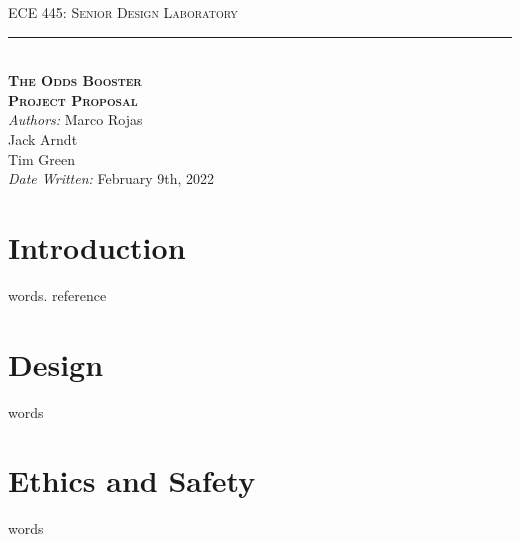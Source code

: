 \documentclass[12pt]{article}
\begin{document}
\begin{titlepage}
\begin{center}
{\LARGE \textsc{ECE 445: Senior Design Laboratory} \\ \vspace{8pt}}
\rule[13pt]{\textwidth}{1pt} \\ \vspace{120pt}
{\huge \textbf{\textsc{The Odds Booster}} \\ \vspace{8pt}}
{\LARGE \textbf{\textsc{Project Proposal}} \\ \vspace{30pt}} 
{\large \textit{Authors:} Marco Rojas \\ \vspace{4pt}
\hspace{48pt} Jack Arndt \\ \vspace{4pt}
\hspace{48pt} Tim Green \\ \vspace{4pt}
\hspace{8pt} \textit{Date Written:} February 9th, 2022}
\vfill
\end{center}

\end{titlepage}
\setcounter{page}{2}

\section{Introduction}

words. reference \cite{Pozar}

\section{Design}

words

\section{Ethics and Safety}

words



\end{document}
